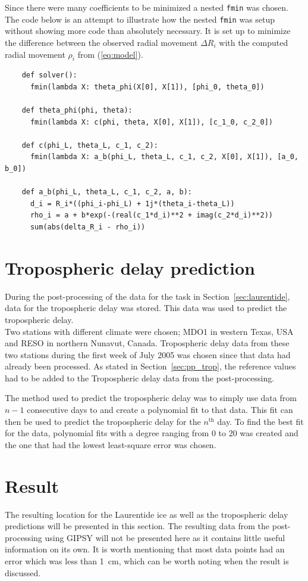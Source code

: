 \documentclass[12pt,a4paper]{article}
\begin{document}
Since there were many coefficients to be minimized a nested \texttt{fmin} was chosen.
The code below is an attempt to illustrate how the nested \texttt{fmin} was setup without showing more code than absolutely necessary.
It is set up to minimize the difference between the observed radial movement $\Delta R_i$ with the computed radial movement $\rho_i$ from (\ref{eq:model}).
\begin{table}
  \begin{lstlisting}
    def solver():
      fmin(lambda X: theta_phi(X[0], X[1]), [phi_0, theta_0])

    def theta_phi(phi, theta):
      fmin(lambda X: c(phi, theta, X[0], X[1]), [c_1_0, c_2_0])

    def c(phi_L, theta_L, c_1, c_2):
      fmin(lambda X: a_b(phi_L, theta_L, c_1, c_2, X[0], X[1]), [a_0, b_0])

    def a_b(phi_L, theta_L, c_1, c_2, a, b):
      d_i = R_i*((phi_i-phi_L) + 1j*(theta_i-theta_L))
      rho_i = a + b*exp(-(real(c_1*d_i)**2 + imag(c_2*d_i)**2))
      sum(abs(delta_R_i - rho_i))
  \end{lstlisting}
\end{table}

\section{Tropospheric delay prediction}
During the post-processing of the data for the task in Section~\ref{sec:laurentide}, data for the tropospheric delay was stored.
This data was used to predict the tropospheric delay.\\

\noindent Two stations with different climate were chosen; MDO1 in western Texas, USA and RESO in northern Nunavut, Canada.
Tropospheric delay data from these two stations during the first week of July 2005 was chosen since that data had already been processed.
As stated in Section~\ref{sec:pp_trop}, the reference values had to be added to the Tropospheric delay data from the post-processing.

The method used to predict the tropospheric delay was to simply use data from $n-1$ consecutive days to and create a polynomial fit to that data.
This fit can then be used to predict the tropospheric delay for the $n^{\text{th}}$ day.
To find the best fit for the data, polynomial fits with a degree ranging from 0 to 20 was created and the one that had the lowest least-square error was chosen.

\section{Result}
The resulting location for the Laurentide ice as well as the tropospheric delay predictions will be presented in this section.
The resulting data from the post-processing using GIPSY will not be presented here as it contains little useful information on its own.
It is worth mentioning that most data points had an error which was less than \SI{1}{\centi\meter}, which can be worth noting when the result is discussed.
\end{document}
